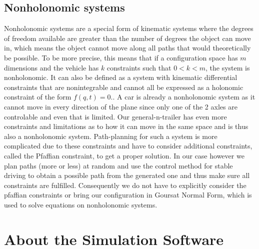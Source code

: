 
\subsection{Nonholonomic systems}
\label{sec:nonholonomic_systems}

Nonholonomic systems are a special form of kinematic systems where the degrees of freedom available are greater than the number of degrees the object can move in, which means the object cannot move along all paths that would theoretically be possible. To be more precise, this means that if a configuration space has $m$ dimensions and the vehicle has $k$ constraints such that $0<k<m$, the system is nonholonomic. It can also be defined as a system with kinematic differential constraints that are nonintegrable and cannot all be expressed as a holonomic constraint of the form $f(q,t)=0$.\cite{29,30}. A car is already a nonholonomic system as it cannot move in every direction of the plane since only one of the 2 axles are controlable and even that is limited. Our general-n-trailer has even more constraints and limitations as to how it can move in the same space and is thus also a nonholonomic system. Path-planning for such a system is more complicated due to these constraints and have to consider additional constraints, called the Pfaffian constraint, to get a proper solution. 
In our case however we plan paths (more or less) at random and use the control method for stable driving to obtain a possible path from the generated one and thus make sure all constraints are fulfilled. Consequently we do not have to explicitly consider the pfaffian constraints or bring our configuration in Goursat Normal Form, which is used to solve equations on nonholonomic systems.


\section{About the Simulation Software}
\label{sec:previous_knowledge_ezsystems}
